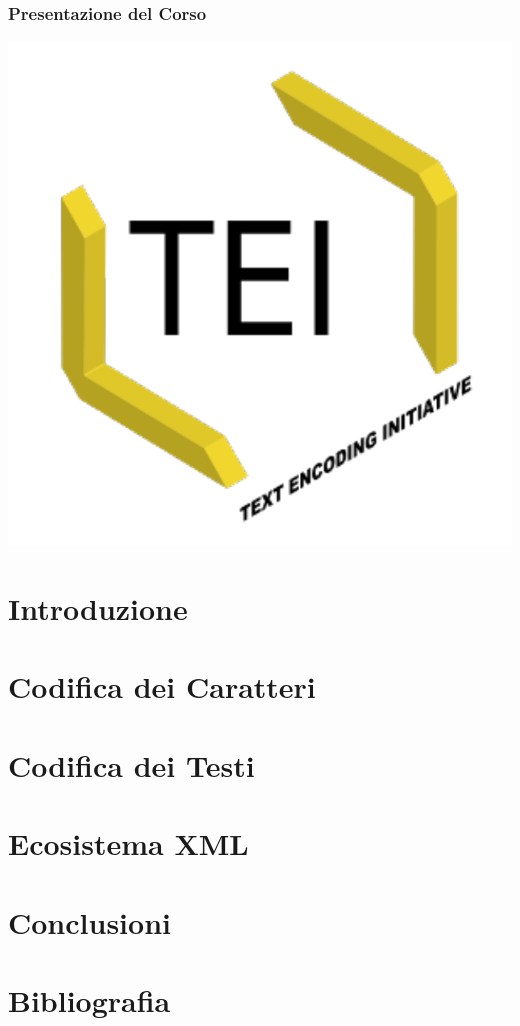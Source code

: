 \documentclass{beamer}
\begin{document}
\begin{frame}
	\frametitle{Presentazione del Corso}
	\addtocounter{nframe}{1}

	\begin{center}
		\includegraphics[width=.5\textwidth]{../imgs/tei-r.pdf}
	\end{center}


\end{frame}



\section{Introduzione}


\section{Codifica dei Caratteri}


\section{Codifica dei Testi}


\section{Ecosistema XML}


\section{Conclusioni}


\section{Bibliografia}

\end{document}
